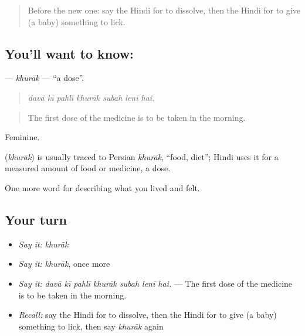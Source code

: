\label{lesson:HI-C489-khurak}



\begin{quote}
Before the new one: say the Hindi for to dissolve, then the Hindi for to give (a baby) something to lick.
\end{quote}

\subsection*{You'll want to know: }
\textbf{} — \emph{khurāk} — \textquotedblleft{}a dose\textquotedblright{}.

\begin{quote}
      
\end{quote}

\begin{quote}
\emph{davā kī pahlī khurāk subah lenī hai.}
\end{quote}

\begin{quote}
The first dose of the medicine is to be taken in the morning.
\end{quote}

Feminine.

\begin{cousinweb}
\textbf{} (\emph{khurāk}) is usually traced to Persian \emph{khurāk}, \textquotedblleft{}food, diet\textquotedblright{}; Hindi uses it for a measured amount of food or medicine, a dose.
\end{cousinweb}

\begin{grammarlens}[title={What you've built}]
One more word for describing what you lived and felt.
\end{grammarlens}

\subsection*{Your turn}
\begin{itemize}
\raggedright
  \item \emph{Say it:} \emph{khurāk}
  \item \emph{Say it:} \emph{khurāk}, once more
  \item \emph{Say it:} \emph{davā kī pahlī khurāk subah lenī hai.} — The first dose of the medicine is to be taken in the morning.
  \item \emph{Recall:} say the Hindi for to dissolve, then the Hindi for to give (a baby) something to lick, then say \emph{khurāk} again
\end{itemize}


